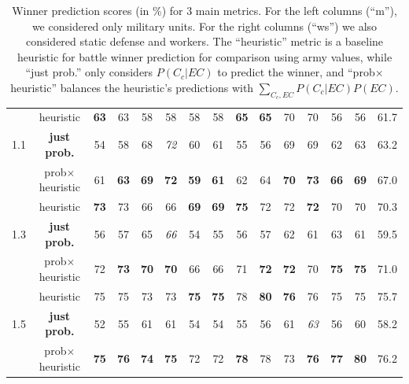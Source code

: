 \begin{table}[h]
\begin{center}
\begin{small}
\begin{tabular}{|c|c|cc|cc|cc|cc|cc|cc|c|}
& heuristic & \textbf{63} & 63 & 58 & 58 & 58 & 58 & \textbf{65} & \textbf{65} & 70 & 70 & 56 & 56 & 61.7 \\
1.1     & \textbf{just prob.} & 54 & 58 & 68 & \textit{72} & 60 & 61 & 55 & 56 & 69 & 69 & 62 & 63 & 63.2 \\ 
    & prob$\times$heuristic & 61 & \textbf{63} & \textbf{69} & \textbf{72} & \textbf{59} & \textbf{61} & 62 & 64 & \textbf{70} & \textbf{73} & \textbf{66} & \textbf{69} & 67.0 \\
\hline
& heuristic & \textbf{73} & 73 & 66 & 66 & \textbf{69} & \textbf{69} & \textbf{75} & 72 & 72 & \textbf{72} & 70 & 70 & 70.3 \\
1.3     & \textbf{just prob.} & 56 & 57 & 65 & \textit{66} & 54 & 55 & 56 & 57 & 62 & 61 & 63 & 61 & 59.5 \\
    & prob$\times$heuristic & 72 & \textbf{73} & \textbf{70} & \textbf{70} & 66 & 66 & 71 & \textbf{72} & \textbf{72} & 70 & \textbf{75} & \textbf{75} & 71.0 \\
\hline
& heuristic & 75 & 75 & 73 & 73 & \textbf{75} & \textbf{75} & 78 & \textbf{80} & \textbf{76} & 76 & 75 & 75 & 75.7 \\
1.5     & \textbf{just prob.} & 52 & 55 & 61 & 61 & 54 & 54 & 55 & 56 & 61 & \textit{63} & 56 & 60 & 58.2 \\
    & prob$\times$heuristic & \textbf{75} & \textbf{76} & \textbf{74} & \textbf{75} & 72 & 72 & \textbf{78} & 78 & 73 & \textbf{76} & \textbf{77} & \textbf{80} & 76.2 \\
\hline
\end{tabular}
\end{small}
\caption{Winner prediction scores (in \%) for 3 main metrics. For the left columns (``m''), we considered only military units. For the right columns (``ws'') we also considered static defense and workers. The ``heuristic'' metric is a baseline heuristic for battle winner prediction for comparison using army values, while ``just prob.'' only considers $P(C_c|EC)$ to predict the winner, and ``prob$\times$heuristic'' balances the heuristic's predictions with $\sum_{C_c,EC}P(C_c|EC)P(EC)$.}
\label{tab:openingsresults}
\end{center}
\end{table}



